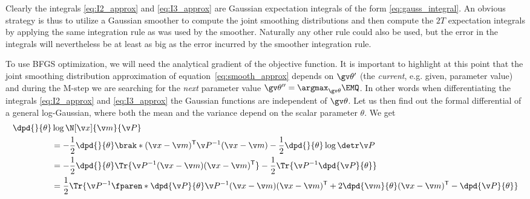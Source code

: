 Clearly the integrals \eqref{eq:I2_approx} and \eqref{eq:I3_approx} are Gaussian
expectation integrals of the form \eqref{eq:gauss_integral}. An obvious
strategy is thus to utilize a Gaussian smoother to compute the joint
smoothing distributions and then compute the $2T$ expectation integrals
by applying the same integration rule as was used by the smoother. Naturally
any other rule could also be used, but the error in the integrals
will nevertheless be at least as big as the error incurred by the smoother
integration rule.

To use BFGS optimization, we will need the analytical gradient of the objective function.
It is important to highlight at this point that the joint smoothing distribution approximation
of equation~\eqref{eq:smooth_approx} depends on $\Th'$ (the \emph{current}, e.g. given, parameter value)
and during the M-step we are searching for the \emph{next} parameter value $\Th^{\prime\prime}=\argmax_{\Th}\EMQ$. In other words
when differentiating the integrals \eqref{eq:I2_approx} and \eqref{eq:I3_approx} the Gaussian functions
are independent of $\Th$.
Let us then find out the formal differential of a general log-Gaussian, where
both the mean and the variance depend on the scalar parameter $\theta$. We get
\begin{align}
	\dpd{}{\theta}&\log\N[\x]{\m}{\P}\\
	&=-\frac{1}{2}\dpd{}{\theta}\brak*{(\x-\m)^\tr\P^{-1}(\x-\m)}-\frac{1}{2}\dpd{}{\theta}\log\detr\P\\		
	&=-\frac{1}{2}\dpd{}{\theta}\Tr{\P^{-1}(\x-\m)(\x-\m)^\tr}-\frac{1}{2}\Tr{\P^{-1}\dpd{\P}{\theta}}\\		
	&=\frac{1}{2}\Tr{\P^{-1}\fparen*{\dpd{\P}{\theta}\P^{-1}(\x-\m)(\x-\m)^\tr+2\dpd{\m}{\theta}(\x-\m)^\tr-\dpd{\P}{\theta}}}		
\end{align}


